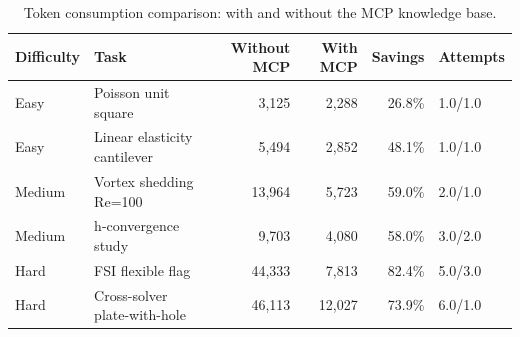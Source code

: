 \begin{table}[htbp!]
  \centering
  \caption{Token consumption comparison: with and without the MCP knowledge base.}
  \label{tab:token_savings}
  \small
  \begin{tabular}{llrrrl}
    \toprule
    Difficulty & Task & Without MCP & With MCP & Savings & Attempts \\
    \midrule
    Easy & Poisson unit square & 3,125 & 2,288 & 26.8\% & 1.0/1.0 \\
    Easy & Linear elasticity cantilever & 5,494 & 2,852 & 48.1\% & 1.0/1.0 \\
    Medium & Vortex shedding Re=100 & 13,964 & 5,723 & 59.0\% & 2.0/1.0 \\
    Medium & h-convergence study & 9,703 & 4,080 & 58.0\% & 3.0/2.0 \\
    Hard & FSI flexible flag & 44,333 & 7,813 & 82.4\% & 5.0/3.0 \\
    Hard & Cross-solver plate-with-hole & 46,113 & 12,027 & 73.9\% & 6.0/1.0 \\
    \bottomrule
  \end{tabular}
\end{table}